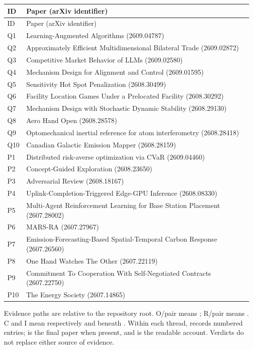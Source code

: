 \documentclass[11pt,a4paper]{article}
\begin{document}
\begin{longtable}{lp{108mm}}
\toprule ID&Paper (arXiv identifier)\\\midrule\endfirsthead
\toprule ID&Paper (arXiv identifier)\\\midrule\endhead
Q1&Learning-Augmented Algorithms (2609.04787)\\
Q2&Approximately Efficient Multidimensional Bilateral Trade (2609.02872)\\
Q3&Competitive Market Behavior of LLMs (2609.02580)\\
Q4&Mechanism Design for Alignment and Control (2609.01595)\\
Q5&Sensitivity Hot Spot Penalization (2608.30499)\\
Q6&Facility Location Games Under a Prelocated Facility (2608.30292)\\
Q7&Mechanism Design with Stochastic Dynamic Stability (2608.29130)\\
Q8&Aero Hand Open (2608.28578)\\
Q9&Optomechanical inertial reference for atom interferometry (2608.28418)\\
Q10&Canadian Galactic Emission Mapper (2608.28159)\\
P1&Distributed risk-averse optimization via CVaR (2609.04460)\\
P2&Concept-Guided Exploration (2608.23650)\\
P3&Adversarial Review (2608.18167)\\
P4&Uplink-Completion-Triggered Edge-GPU Inference (2608.08330)\\
P5&Multi-Agent Reinforcement Learning for Base Station Placement (2607.28002)\\
P6&MARS-RA (2607.27967)\\
P7&Emission-Forecasting-Based Spatial-Temporal Carbon Response (2607.26560)\\
P8&One Hand Watches The Other (2607.22119)\\
P9&Commitment To Cooperation With Self-Negotiated Contracts (2607.22750)\\
P10&The Energy Society (2607.14865)\\
\bottomrule
\end{longtable}

Evidence paths are relative to the repository root. O/pair means
; R/pair means
.
C and I mean respectively  and
 beneath
.
Within each thread,  records numbered entries;
 is the final paper when present, and
 is the readable account. Verdicts do not replace
either source of evidence.
\end{document}

